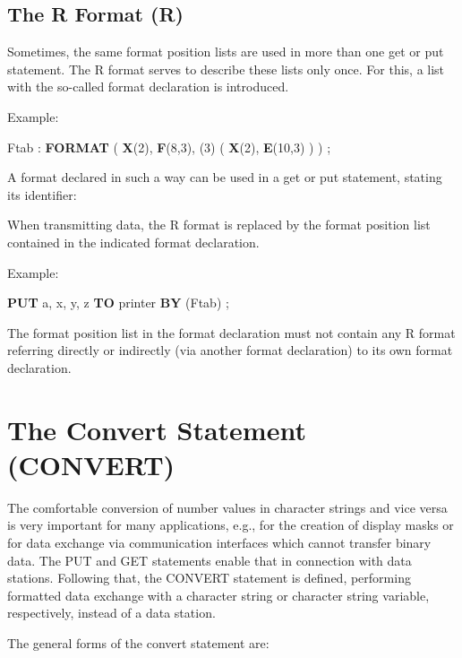 \subsection{The R Format (R)}   %
\label{sec_dation_r_format}

Sometimes, the same format position lists are used in more than one get
or put statement. The R format serves to describe these lists only
once. For this, a list with the so-called format declaration is
introduced.



Example:

Ftab : {\bf FORMAT} ( {\bf X}(2), {\bf F}(8,3), (3) ( {\bf X}(2), {\bf E}(10,3) ) ) ;

A format declared in such a way can be used in a get or put statement,
stating its identifier:



When transmitting data, the R format is replaced by the format position
list contained in the indicated format declaration.

Example:

{\bf PUT} a, x, y, z {\bf TO} printer {\bf BY }(Ftab) ;

The format position list in the format declaration must not contain any
R format referring directly or indirectly (via another format
declaration) to its own format declaration.

\section{The Convert Statement (CONVERT)}   %
\label{sec_convert}

The comfortable conversion of number values in character strings and
vice versa is very important for many applications, e.g., for the
creation of display masks or for data exchange via communication
interfaces which cannot transfer binary data. The PUT and GET
statements enable that in connection with data stations. Following
that, the CONVERT statement is defined, performing formatted data
exchange with a character string or character string variable,
respectively, instead of a data station.

The general forms of the convert statement are:

